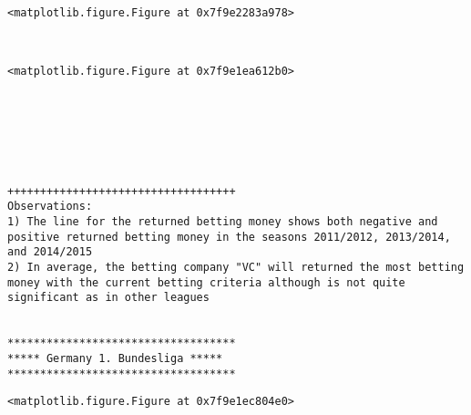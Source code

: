 \documentclass[11pt]{article}
\begin{document}
    
    \begin{verbatim}
<matplotlib.figure.Figure at 0x7f9e2283a978>
    \end{verbatim}

    
    \begin{center}
    \end{center}
    { \hspace*{\fill} \\}
    
    
    \begin{verbatim}
<matplotlib.figure.Figure at 0x7f9e1ea612b0>
    \end{verbatim}

    
    \begin{center}
    \end{center}
    { \hspace*{\fill} \\}
    
    \begin{center}
    \end{center}
    { \hspace*{\fill} \\}
    
    \begin{center}
    \end{center}
    { \hspace*{\fill} \\}
    
    \begin{Verbatim}[commandchars=\\\{\}]
+++++++++++++++++++++++++++++++++++
Observations: 
1) The line for the returned betting money shows both negative and positive returned betting money in the seasons 2011/2012, 2013/2014, and 2014/2015
2) In average, the betting company "VC" will returned the most betting money with the current betting criteria although is not quite significant as in other leagues


***********************************
***** Germany 1. Bundesliga *****
***********************************

    \end{Verbatim}

    
    \begin{verbatim}
<matplotlib.figure.Figure at 0x7f9e1ec804e0>
    \end{verbatim}
\end{document}
